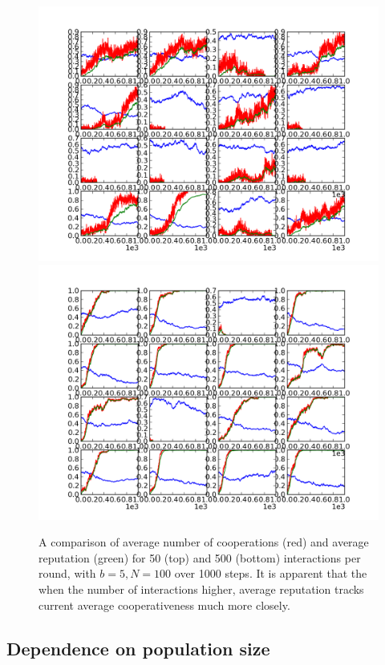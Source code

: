 \documentclass{amsart}
\begin{document}
\begin{figure}[h]
\caption{A comparison of average number of cooperations (red) and
  average reputation (green) for 50 (top) and 500 (bottom)
  interactions per round, with $b=5,N=100$ over 1000 steps. It is
  apparent that the when the number of interactions higher, average
  reputation tracks current average cooperativeness much more
  closely.}

\includegraphics[width=\textwidth]{lag50.png}
\includegraphics[width=\textwidth]{lag500.png}
\label{fig:lag}
\end{figure}

\subsection{Dependence on population size}
\end{document}

